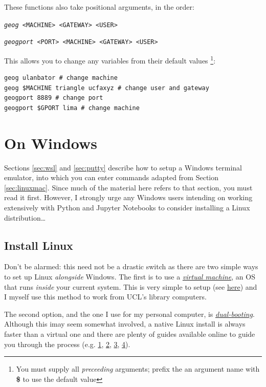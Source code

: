 \documentclass[a4paper]{article}
\begin{document}
These functions also take positional arguments, in the order:

\texttt{\emph{geog} \textless{}MACHINE\textgreater{} \textless{}GATEWAY\textgreater{} \textless{}USER\textgreater{}}
{}

\texttt{\emph{geogport} \textless{}PORT\textgreater{} \textless{}MACHINE\textgreater{} \textless{}GATEWAY\textgreater{} \textless{}USER\textgreater{}}

This allows you to change any variables from their default values \footnote{You must supply all \emph{preceeding} arguments; prefix the an argument name with \textbf{\$} to use the default value}:

\begin{lstlisting}[caption={Examples of arguments to geography login/tunnel functions}, label={lst:gfuncsargseg}]
geog ulanbator # change machine
geog $MACHINE triangle ucfaxyz # change user and gateway
geogport 8889 # change port
geogport $GPORT lima # change machine
\end{lstlisting}

\section{On Windows}
\label{sec:windows}

Sections \ref{sec:wsl} and \ref{sec:putty} describe how to setup a Windows terminal emulator, into which you can enter commands adapted from Section \ref{sec:linuxmac}.
Since much of the material here refers to that section, you must read it first.
However, I strongly urge any Windows users intending on working extensively with Python and Jupyter Notebooks to consider installing a Linux distribution\ldots

\subsection{Install Linux}
\label{sec:win2lnx}
Don't be alarmed: this need not be a drastic switch as there are two simple ways to set up Linux \emph{alongside} Windows.
The first is to use a \emph{\href{https://www.howtogeek.com/196060/beginner-geek-how-to-create-and-use-virtual-machines/}{virtual machine}}, an OS that runs \emph{inside} your current system.
This is very simple to setup (see \href{http://www.storagecraft.com/blog/the-dead-simple-guide-to-installing-a-linux-virtual-machine-on-windows/}{here}) and I myself use this method to work from UCL's library computers.

The second option, and the one I use for my personal computer, is \emph{\href{https://www.howtogeek.com/187789/dual-booting-explained-how-you-can-have-multiple-operating-systems-on-your-computer/}{dual-booting}}.
Although this imay seem somewhat involved, a native Linux install is always faster than a virtual one and there are plenty of guides available online to guide you through the process (e.g. \href{https://itsfoss.com/guide-install-linux-mint-16-dual-boot-windows/}{1}, \href{https://www.lifewire.com/ultimate-windows-7-ubuntu-linux-dual-boot-guide-2200.53}{2}, \href{https://www.howtogeek.com/214571/how-to-dual-boot-linux-on-your-pc/}{3}, \href{http://www.pcworld.com/article/2955460/operating-systems/dual-booting-linux-with-windows-what-you-need-to-know.html}{4}). 
\end{document}
